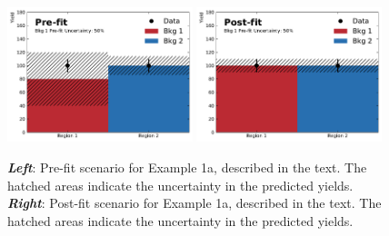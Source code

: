 \begin{figure}[!htb]
    \begin{center}
        \includegraphics[width=0.48\textwidth]{figures/common_ana/stat_hypo/profile_examples/profile_ex_1_NP50_pre}
        \includegraphics[width=0.48\textwidth]{figures/common_ana/stat_hypo/profile_examples/profile_ex_1_NP50_post}
        \caption{
            \textbf{\textit{Left}}: Pre-fit scenario for Example 1a, described in the text.
                The hatched areas indicate the uncertainty in the predicted yields.
            \textbf{\textit{Right}}: Post-fit scenario for Example 1a, described in the text.
                The hatched areas indicate the uncertainty in the predicted yields.
        }
        \label{fig:prof_ex_1_np50}
    \end{center}
\end{figure}

